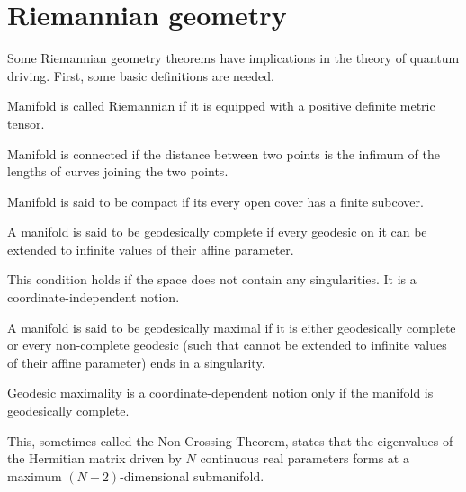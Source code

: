 
\section{Riemannian geometry}
Some Riemannian geometry theorems have implications in the theory of quantum driving. First, some basic definitions are needed.

\begin{definition}
    Manifold is called Riemannian if it is equipped with a positive definite metric tensor.
\end{definition}
\begin{definition}
    Manifold is connected if the distance between two points is the infimum of the lengths of curves joining the two points.
\end{definition}
\begin{definition}
    Manifold is said to be compact if its every open cover has a finite subcover.
\end{definition}
\begin{definition}
    A manifold is said to be geodesically complete if every geodesic on it can be extended to infinite values of their affine parameter. 
\end{definition}
This condition holds if the space does not contain any singularities. It is a coordinate-independent notion.
\begin{definition}
    A manifold is said to be geodesically maximal if it is either geodesically complete or every non-complete geodesic (such that cannot be extended to infinite values of their affine parameter) ends in a singularity.
\end{definition}
Geodesic maximality is a coordinate-dependent notion only if the manifold is geodesically complete.


\begin{thm}\citet[page 305]{landau}
    \label{thm:n-2}

    This, sometimes called the Non-Crossing Theorem, states that the eigenvalues of the Hermitian matrix driven by $N$ continuous real parameters forms at a maximum $(N-2)$-dimensional submanifold.
\end{thm}


